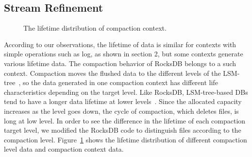 \subsection{Stream Refinement}
\begin{figure}[!t]
\centering
\hspace{1pt}
\hfill
\vspace{-10pt}
\vspace{-10pt}
\caption{The lifetime distribution of compaction context.} 
\label{fig:compaction}
\vspace{-15pt}
\end{figure}

According to our observations, the lifetime of data is similar for contexts
with simple operations such as log, as shown in section 2, but some contexts
generate various lifetime data.  The compaction behavior of RocksDB belongs to
a such context.  Compaction moves the flushed data to the different levels of
the LSM-tree~\cite{RocksDB}, so the data generated in one compaction context
has different life characteristics depending on the target level.  Like
RocksDB, LSM-tree-based DBs tend to have a longer data lifetime at lower
levels~\cite{Level}.  Since the allocated capacity increases as the level goes
down, the cycle of compaction, which deletes files, is long at low level.  In
order to see the difference in the lifetime of each compaction target level, we
modified the RocksDB code to distinguish files according to the compaction
level.  Figure~\ref{fig:compaction} shows the lifetime distribution of
different compaction level data and compaction context data.

